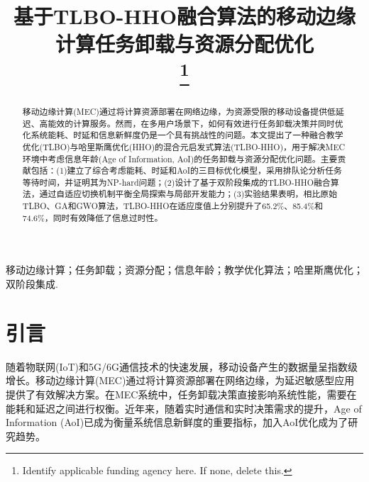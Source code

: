 \documentclass[conference]{IEEEtran}
\begin{document}
\title{基于TLBO-HHO融合算法的移动边缘计算任务卸载与资源分配优化\\
\thanks{Identify applicable funding agency here. If none, delete this.}
}

\author{
\and
{}
\and
{}
}

\maketitle

\begin{abstract}
移动边缘计算(MEC)通过将计算资源部署在网络边缘，为资源受限的移动设备提供低延迟、高能效的计算服务。然而，在多用户场景下，如何有效进行任务卸载决策并同时优化系统能耗、时延和信息新鲜度仍是一个具有挑战性的问题。本文提出了一种融合教学优化(TLBO)与哈里斯鹰优化(HHO)的混合元启发式算法(TLBO-HHO)，用于解决MEC环境中考虑信息年龄(Age of Information, AoI)的任务卸载与资源分配优化问题。主要贡献包括：(1)建立了综合考虑能耗、时延和AoI的三目标优化模型，采用排队论分析任务等待时间，并证明其为NP-hard问题；(2)设计了基于双阶段集成的TLBO-HHO融合算法，通过自适应切换机制平衡全局探索与局部开发能力；(3)实验结果表明，相比原始TLBO、GA和GWO算法，TLBO-HHO在适应度值上分别提升了65.2\%、85.4\%和74.6\%，同时有效降低了信息过时性。
\end{abstract}

\begin{IEEEkeywords}
移动边缘计算；任务卸载；资源分配；信息年龄；教学优化算法；哈里斯鹰优化；双阶段集成.
\end{IEEEkeywords}

\section{引言}
随着物联网(IoT)和5G/6G通信技术的快速发展，移动设备产生的数据量呈指数级增长。移动边缘计算(MEC)通过将计算资源部署在网络边缘，为延迟敏感型应用提供了有效解决方案\cite{b1}。在MEC系统中，任务卸载决策直接影响系统性能，需要在能耗和延迟之间进行权衡。近年来，随着实时通信和实时决策需求的提升，Age of Information (AoI)已成为衡量系统信息新鲜度的重要指标\cite{b15}，加入AoI优化成为了研究趋势。
\end{document}
